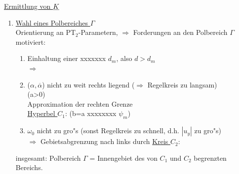 \documentclass[openany,a4paper,11pt]{book}
\begin{document}
\uline{Ermittlung von $\uline{K}$}\begin{enumerate}
    \item \uline{Wahl eines Polbereiches $\Gamma$}\\
    Orientierung an PT$_2$-Parametern,  $\Rightarrow$ Forderungen an den Polbereich $\Gamma$ motiviert:\begin{enumerate}
        \item Einhaltung einer xxxxxxx $d_m$, also $d>d_m$\\
        $\Rightarrow$ 
        \item ($\alpha,\overline{\alpha}$) nicht zu weit rechts liegend ($\Rightarrow$ Regelkreis zu langsam)\\
         \quad (a>0)\\
        Approximation der rechten Grenze\\
        \uline{Hyperbel $C_1$}: \quad {} \quad (b=a xxxxxxxx $\psi_m$)
        \item $\omega_0$ nicht zu gro"s (sonst Regelkreis zu schnell, d.h. $|u_y|$ zu gro"s)\\
         $\Rightarrow$ Gebietsabgrenzung nach links durch \uline{Kreis $C_2$}: \quad {}\\
    \end{enumerate}
    insgesamt: Polbereich $\Gamma$ = Innengebiet des von $C_1$ und $C_2$ begrenzten Bereichs.
    \begin{tikzpicture}
	    

\end{tikzpicture}
\end{enumerate}
\end{document}
